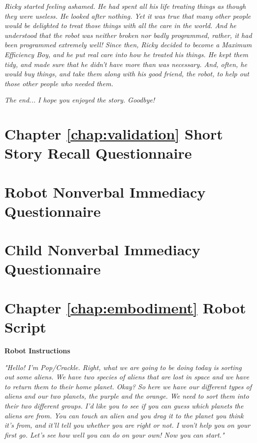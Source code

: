 \textit{Ricky started feeling ashamed. He had spent all his life treating things as though they were useless. He looked after nothing. Yet it was true that many other people would be delighted to treat those things with all the care in the world. And he understood that the robot was neither broken nor badly programmed, rather, it had been programmed extremely well! Since then, Ricky decided to become a Maximum Efficiency Boy, and he put real care into how he treated his things. He kept them tidy, and made sure that he didn't have more than was necessary. And, often, he would buy things, and take them along with his good friend, the robot, to help out those other people who needed them.}

\textit{The end... I hope you enjoyed the story. Goodbye!}

\cleartooddpage
\chapter{Chapter \ref{chap:validation} Short Story Recall Questionnaire} \label{app:story_questions}


\cleartooddpage
\chapter{Robot Nonverbal Immediacy Questionnaire} \label{app:rniq}


\cleartooddpage
\chapter{Child Nonverbal Immediacy Questionnaire} \label{app:cniq}


\cleartooddpage
\chapter{Chapter \ref{chap:embodiment} Robot Script} \label{app:ch6-robotscript}
\textbf{Robot Instructions}

\textit{"Hello! I'm Pop/Crackle. Right, what we are going to be doing today is sorting out some aliens. We have two species of aliens that are lost in space and we have to return them to their home planet. Okay? So here we have our different types of aliens and our two planets, the purple and the orange. We need to sort them into their two different groups. I'd like you to see if you can guess which planets the aliens are from. You can touch an alien and you drag it to the planet you think it's from, and it'll tell you whether you are right or not. I won't help you on your first go. Let's see how well you can do on your own! Now you can start."}

